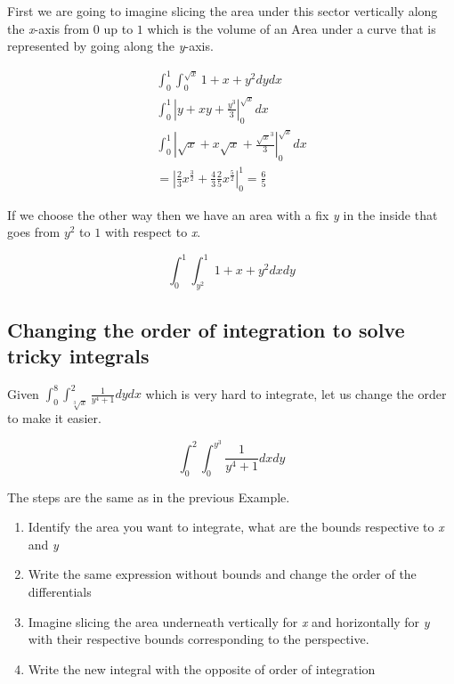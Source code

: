 First we are going to imagine slicing the area under this sector vertically along the \emph{x}-axis from 
\(0\) up to \(1\) which is the volume of an Area under a curve that is represented by going along the 
\emph{y}-axis.

\begin{align*}
    \int_{0}^{1}\int_{0}^{\sqrt{x}} 1 + x + y^2 dy dx \\
    \int_{0}^{1} \left| y + xy + \frac{y^3}{3} \right|_{0}^{\sqrt{x}} dx \\
    \int_{0}^{1} \left| \sqrt{x} + x\sqrt{x} + \frac{\sqrt{x}^3}{3} \right|_{0}^{\sqrt{x}} dx \\
    = \left| \frac{2}{3} x^{\frac{3}{2}} + \frac{4}{3} \frac{2}{5} x^{\frac{5}{2}} \right|_{0}^{1} = \frac{6}{5}
\end{align*}

If we choose the other way then we have an area with a fix \emph{y} in the inside that goes from \(y^2\) to 
\(1\) with respect to \emph{x}.

\[
    \int_{0}^{1}\int_{y^2}^{1} 1 + x + y^2 dx dy
\]

\subsection{Changing the order of integration to solve tricky integrals}

Given \(\int_{0}^{8}\int_{\sqrt[3]{x}}^{2} \frac{1}{y^4 +1}dy dx\) which is very hard to integrate, 
let us change the order to make it easier.

\[
    \int_{0}^{2}\int_{0}^{y^3} \frac{1}{y^4 +1}dx dy
\]

The steps are the same as in the previous Example.

\begin{enumerate}

    \item Identify the area you want to integrate, what are the bounds respective to \emph{x} and \emph{y}

    \item Write the same expression without bounds and change the order of the differentials


    \item Imagine slicing the area underneath vertically for \emph{x} and horizontally for \emph{y} with their 
          respective bounds corresponding to the perspective.

    \item Write the new integral with the opposite of order of integration

\end{enumerate}

